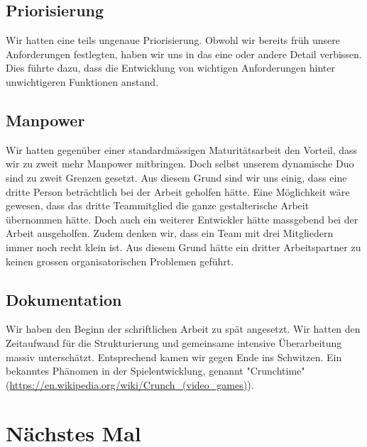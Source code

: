 \subsection*{Priorisierung}
Wir hatten eine teils ungenaue Priorisierung. Obwohl wir bereits früh unsere Anforderungen festlegten, haben wir uns in das eine oder andere Detail verbissen.
Dies führte dazu, dass die Entwicklung von wichtigen Anforderungen hinter unwichtigeren Funktionen anstand. 


\subsection*{Manpower} \label{subsec:neusm}
Wir hatten gegenüber einer standardmässigen Maturitätsarbeit den Vorteil, dass wir zu zweit mehr Manpower mitbringen. Doch selbst unserem dynamische Duo sind zu zweit Grenzen gesetzt.
Aus diesem Grund sind wir uns einig, dass eine dritte Person beträchtlich bei der Arbeit geholfen hätte. Eine Möglichkeit wäre gewesen, dass das dritte Teammitglied die ganze
gestalterische Arbeit übernommen hätte. Doch auch ein weiterer Entwickler hätte massgebend bei der Arbeit ausgeholfen. Zudem denken wir, dass ein Team mit drei Mitgliedern
immer noch recht klein ist. Aus diesem Grund hätte ein dritter Arbeitspartner zu keinen grossen organisatorischen Problemen geführt.


\subsection*{Dokumentation}
Wir haben den Beginn der schriftlichen Arbeit zu spät angesetzt. Wir hatten den Zeitaufwand für die Strukturierung und gemeinsame intensive Überarbeitung massiv unterschätzt.
Entsprechend kamen wir gegen Ende ins Schwitzen. Ein bekanntes Phänomen in der Spielentwicklung, genannt "Crunchtime" (\url{https://en.wikipedia.org/wiki/Crunch_(video_games)}).

\section{Nächstes Mal}

